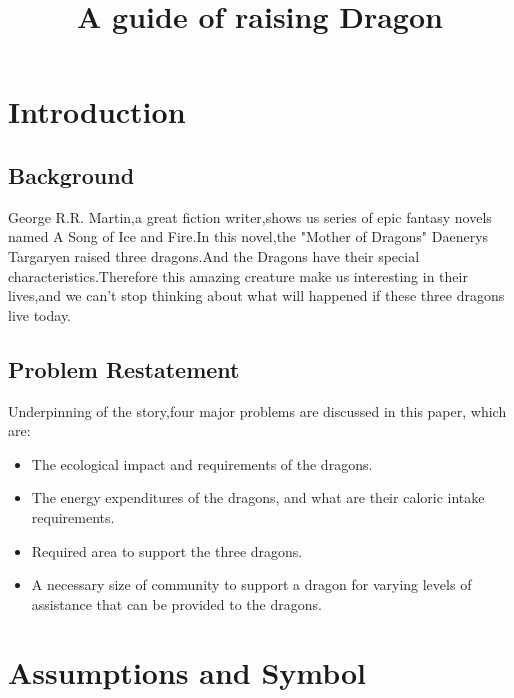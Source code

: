 \documentclass[12pt]{article}
\title{A guide of raising Dragon}  %
\begin{document}

\section{Introduction}
\subsection{Background} %
George R.R. Martin,a great fiction writer,shows us series of epic fantasy novels named A Song of Ice and Fire.In this novel,the "Mother of Dragons" Daenerys Targaryen raised three dragons.And the Dragons have their special characteristics.Therefore this amazing creature make us interesting in their lives,and we can't stop thinking about what will happened if these three dragons live today.


\subsection{Problem Restatement}%
Underpinning of the story,four major problems are discussed in this paper, which are:
\begin{itemize}
		\item The ecological impact and requirements of the dragons.
		\item The energy expenditures of the dragons, and what are their caloric intake requirements. 
		\item Required area to support the three dragons.
		\item A necessary size of community to support a dragon for varying levels of assistance that can be provided to the dragons.
\end{itemize}

\section{Assumptions and Symbol}
\end{document}
